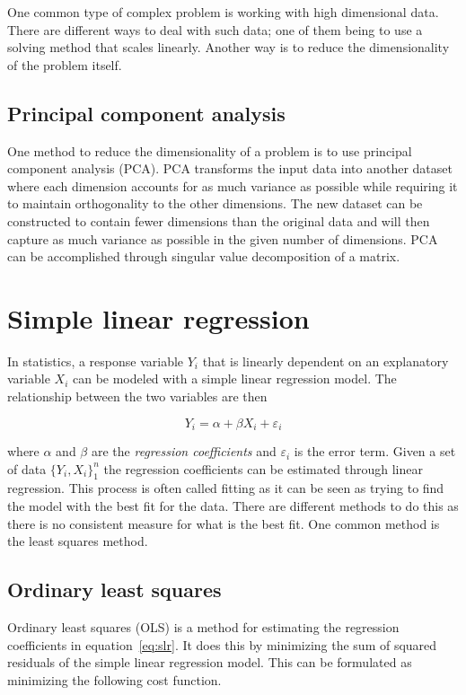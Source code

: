 \documentclass[a4paper]{report}
\begin{document}
One common type of complex problem is working with high dimensional data. There
are different ways to deal with such data; one of them being to use a solving
method that scales linearly. Another way is to reduce the dimensionality of the
problem itself.

\subsection{Principal component analysis}
One method to reduce the dimensionality of a problem is to use principal
component analysis (PCA). PCA transforms the input data into another dataset
where each dimension accounts for as much variance as possible while requiring
it to maintain orthogonality to the other dimensions. The new dataset can be
constructed to contain fewer dimensions than the original data and will then
capture as much variance as possible in the given number of dimensions. PCA can
be accomplished through singular value decomposition of a matrix.

\section{Simple linear regression}
In statistics, a response variable $Y_i$ that is linearly dependent on an
explanatory variable $X_i$ can be modeled with a simple linear regression
model. The relationship between the two variables are then

\begin{equation}
    Y_i = \alpha + \beta X_i + \varepsilon_i
    \label{eq:slr}
\end{equation}

where $\alpha$ and $\beta$ are the \emph{regression coefficients} and
$\varepsilon_i$ is the error term. Given a set of data $\{Y_i, X_i\}_1^n$ the
regression coefficients can be estimated through linear regression. This
process is often called fitting as it can be seen as trying to find the model
with the best fit for the data. There are different methods to do this as there
is no consistent measure for what is the best fit. One common method is the
least squares method.

\subsection{Ordinary least squares}
Ordinary least squares (OLS) is a method for estimating the regression
coefficients in equation~\ref{eq:slr}. It does this by minimizing the sum of
squared residuals of the simple linear regression model. This can be formulated
as minimizing the following cost function.
\end{document}
